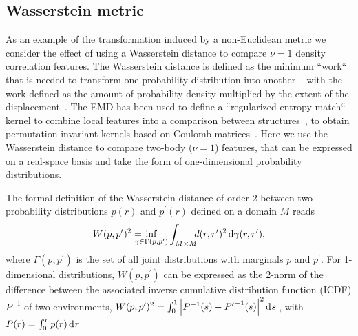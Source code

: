 \subsection{Wasserstein metric}
As an example of the transformation induced by a non-Euclidean metric we consider the effect of using a Wasserstein distance to compare $\nu=1$ density correlation features. 
The Wasserstein distance is defined as the minimum  ``work`` that is needed to transform one probability distribution into another -- with the work defined as the amount of probability density multiplied by the extent of the displacement~\cite{vall74siam,cohe-guib97report,cutu07proc}.
The EMD has been used to define a ``regularized entropy match`` kernel to combine local features into a comparison between structures~\cite{de+16pccp}, to obtain permutation-invariant kernels based on Coulomb matrices~\cite{cayl+20mlst}.
Here we use the Wasserstein distance to compare two-body ($\nu=1$) features, that can be expressed on a real-space basis and take the form of one-dimensional probability distributions. 

The formal definition of the Wasserstein distance of order 2 between two probability distributions $p(r)$ and $p^{\prime}(r)$ defined on a domain $M$ reads
\begin{equation}
W(p,p^{\prime})^2 = \hspace{-1em}\inf_{\gamma\in\Gamma (p,p^{\prime})} \int_{M\times M}\hspace{-0.5em}d(r,r^{\prime})^2\,\mathrm{d}\gamma(r,r^{\prime}),
%
\end{equation}
where $\Gamma(p,p^{\prime})$ is the set of all joint distributions with marginals $p$ and $p^{\prime}$.
For 1-dimensional distributions, $W(p,p^{\prime})$ can be expressed as the 2-norm of the difference between the associated inverse cumulative distribution function (ICDF) $P^{-1}$ of two environments,
$W(p,p^{\prime})^2=\int_0^1  \left|P^{-1}(s) -{P^{\prime}}^{-1}(s)\right|^2\mathop{}\!\mathrm{d}^{}{s}\,$, with $P(r)=\int_0^r p(r)\mathop{}\!\mathrm{d}^{}{r}\,$ 

